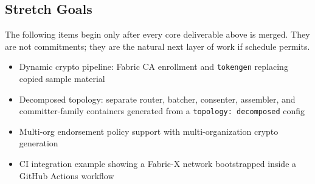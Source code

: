 \subsection*{Stretch Goals}

The following items begin only after every core deliverable
above is merged. They are not commitments; they are the
natural next layer of work if schedule permits.

\begin{itemize}[leftmargin=2em]
  \item Dynamic crypto pipeline: Fabric CA enrollment and
        \texttt{tokengen} replacing copied sample material
  \item Decomposed topology: separate router, batcher,
        consenter, assembler, and committer-family containers
        generated from a \texttt{topology: decomposed} config
  \item Multi-org endorsement policy support with
        multi-organization crypto generation
  \item CI integration example showing a Fabric-X network
        bootstrapped inside a GitHub Actions workflow
\end{itemize}
